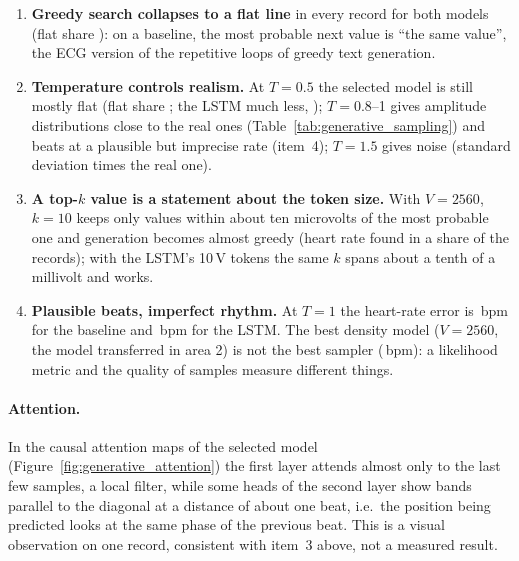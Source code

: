 


\begin{enumerate}[leftmargin=1.4em,itemsep=2pt]
  \item \textbf{Greedy search collapses to a flat line} in every record for both models (flat share
        \generativeGenVocabTwoFiveSixZeroGreedyFracFlat{}): on a baseline, the most probable next value is
        ``the same value'', the ECG version of the repetitive loops of greedy text generation.
  \item \textbf{Temperature controls realism.} At $T = 0.5$ the selected model is still mostly flat
        (flat share \generativeGenVocabTwoFiveSixZeroTZeroFiveFracFlat{}; the LSTM much less,
        \generativeGenLstmTZeroFiveFracFlat{}); $T = 0.8$--1 gives amplitude distributions close to the
        real ones (Table~\ref{tab:generative_sampling}) and beats at a plausible but imprecise rate
        (item~4); $T = 1.5$ gives noise (standard deviation
        \generativeGenVocabTwoFiveSixZeroTOneFiveStdRatio{} times the real one).
  \item \textbf{A top-$k$ value is a statement about the token size.} With $V = 2560$, $k = 10$ keeps only
        values within about ten microvolts of the most probable one and generation becomes almost greedy
        (heart rate found in a share \generativeGenVocabTwoFiveSixZeroTopkOneZeroHrDefinedFrac{} of the
        records); with the LSTM's 10\,\textmu V tokens the same $k$ spans about a tenth of a millivolt and
        works.
  \item \textbf{Plausible beats, imperfect rhythm.} At $T = 1$ the heart-rate error is
        \generativeGenBaseTOneZeroHrMae{}\,bpm for the baseline and \generativeGenLstmTOneZeroHrMae{}\,bpm
        for the LSTM. The best density model ($V = 2560$, the model transferred in area 2) is not the best
        sampler (\generativeGenVocabTwoFiveSixZeroTOneZeroHrMae{}\,bpm): a likelihood metric and the
        quality of samples measure different things.
\end{enumerate}

\paragraph{Attention.} In the causal attention maps of the selected model
(Figure~\ref{fig:generative_attention}) the first layer attends almost only to the last few samples, a
local filter, while some heads of the second layer show bands parallel to the diagonal at a distance of
about one beat, i.e.\ the position being predicted looks at the same phase of the previous beat. This is
a visual observation on one record, consistent with item~3 above, not a measured result.

